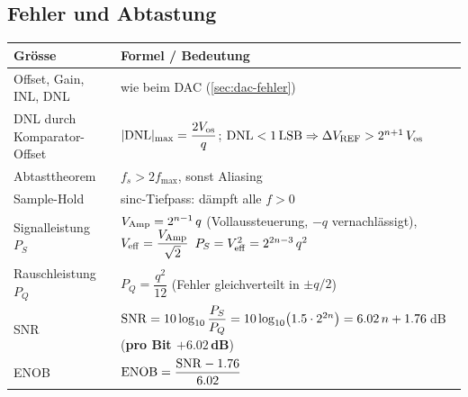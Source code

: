 \subsection{Fehler und Abtastung}\label{sec:adc-fehler}

{\renewcommand{\arraystretch}{1.8}
\begin{tabularx}{\columnwidth}{@{}l X@{}}
	\toprule
	\textbf{Grösse}                 & \textbf{Formel / Bedeutung} \\ \midrule
	Offset, Gain, INL, DNL          & wie beim DAC (\ref{sec:dac-fehler}) \\
	DNL durch Komparator-Offset     & $|{\rm DNL}|_{\max} = \dfrac{2V_{\rm os}}{q}$; \;
	                                  ${\rm DNL} < 1\,{\rm LSB} \Rightarrow \Delta V_{\rm REF} > 2^{n+1}\,V_{\rm os}$ \\
	Abtasttheorem                   & $f_s > 2 f_{\max}$, sonst Aliasing \\
	Sample-Hold                     & sinc-Tiefpass: dämpft alle $f > 0$ \\
	Signalleistung $P_S$            & $V_{\rm Amp} = 2^{n-1}\,q$ (Vollaussteuerung, $-q$ vernachlässigt), \;
	                                  $V_{\rm eff} = \dfrac{V_{\rm Amp}}{\sqrt{2}}$\newline
	                                  $P_S = V_{\rm eff}^{2} = 2^{2n-3}\,q^2$ \\
	Rauschleistung $P_Q$            & $P_Q = \dfrac{q^2}{12}$ (Fehler gleichverteilt in $\pm q/2$) \\
	SNR                             & ${\rm SNR} = 10\log_{10}\dfrac{P_S}{P_Q} = 10\log_{10}\!\left(1.5\cdot 2^{2n}\right) = 6.02\,n + 1.76\,$dB \;
	                                  (\textbf{pro Bit $+6.02\,$dB}) \\
	ENOB                            & ${\rm ENOB} = \dfrac{{\rm SNR}-1.76}{6.02}$ \\ \bottomrule
\end{tabularx}}


